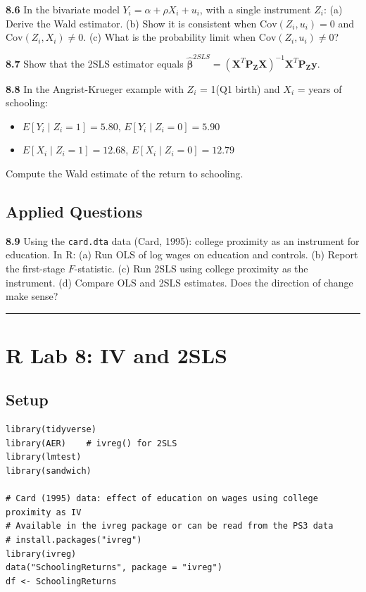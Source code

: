 \textbf{8.6} In the bivariate model $Y_i = \alpha + \rho X_i + u_i$, with a single instrument $Z_i$:
(a) Derive the Wald estimator.
(b) Show it is consistent when $\text{Cov}(Z_i, u_i) = 0$ and $\text{Cov}(Z_i, X_i) \neq 0$.
(c) What is the probability limit when $\text{Cov}(Z_i, u_i) \neq 0$?

\textbf{8.7} Show that the 2SLS estimator equals $\hat{\boldsymbol{\beta}}^{2SLS} = (\mathbf{X}^T\mathbf{P_Z}\mathbf{X})^{-1}\mathbf{X}^T\mathbf{P_Z}\mathbf{y}$.

\textbf{8.8} In the Angrist-Krueger example with $Z_i$ = 1(Q1 birth) and $X_i$ = years of schooling:
\begin{itemize}
\item $E[Y_i \mid Z_i = 1] = 5.80$, $E[Y_i \mid Z_i = 0] = 5.90$
\item $E[X_i \mid Z_i = 1] = 12.68$, $E[X_i \mid Z_i = 0] = 12.79$
\end{itemize}

Compute the Wald estimate of the return to schooling.

\subsection{Applied Questions}

\textbf{8.9} Using the \texttt{card.dta} data (Card, 1995): college proximity as an instrument for education. In R:
(a) Run OLS of log wages on education and controls.
(b) Report the first-stage $F$-statistic.
(c) Run 2SLS using college proximity as the instrument.
(d) Compare OLS and 2SLS estimates. Does the direction of change make sense?

\medskip\hrule\medskip

\section{R Lab 8: IV and 2SLS}

\subsection{Setup}

\begin{lstlisting}
library(tidyverse)
library(AER)    # ivreg() for 2SLS
library(lmtest)
library(sandwich)

# Card (1995) data: effect of education on wages using college proximity as IV
# Available in the ivreg package or can be read from the PS3 data
# install.packages("ivreg")
library(ivreg)
data("SchoolingReturns", package = "ivreg")
df <- SchoolingReturns
\end{lstlisting}

